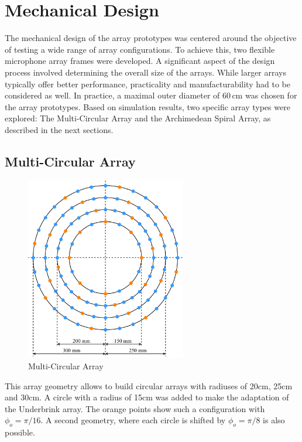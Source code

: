 \newpage
\section{Mechanical Design}
The mechanical design of the array prototypes was centered around the objective of testing a wide range of array configurations.
To achieve this, two flexible microphone array frames were developed.
A significant aspect of the design process involved determining the overall size of the arrays.
While larger arrays typically offer better performance, practicality and manufacturability had to be considered as well.
In practice, a maximal outer diameter of 60\,cm was chosen for the array prototypes.
Based on simulation results, two specific array types were explored: The Multi-Circular Array and the Archimedean Spiral Array, as described in the next sections.

\subsection{Multi-Circular Array}
\begin{minipage}{\linewidth}
	\begin{figure}
		\vspace{-0.8cm}
		\includegraphics[width=7cm]{images/5_array_evaluation/prototype_array_multi_circular.pdf}
		\centering
		\caption{Multi-Circular Array}
		\label{fig:prototype_array_multi_circular}
	\end{figure}
	This array geometry allows to build circular arrays with radiuses of 20cm, 25cm and
	30cm.
	A circle with a radius of 15cm was added to make the adaptation of the Underbrink array. 
	The orange points show such a configuration with $\phi_o = \pi/16$.
	A second geometry, where each circle is shifted by $\phi_o = \pi / 8$ is also possible.
\end{minipage}
\vspace{5.5cm}    %

